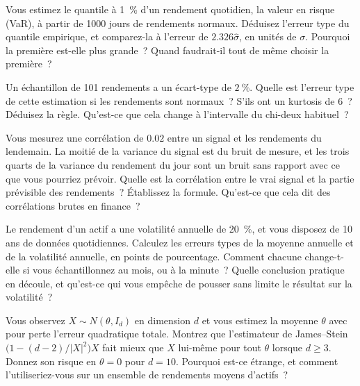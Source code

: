 \begin{question}\label{iq:iv1:statistics:34}
Vous estimez le quantile à 1~\% d'un rendement quotidien, la valeur en risque (VaR), à partir de 1000 jours de rendements normaux. Déduisez l'erreur type du quantile empirique, et comparez-la à l'erreur de $2.326\hat{\sigma}$, en unités de $\sigma$. Pourquoi la première est-elle plus grande~? Quand faudrait-il tout de même choisir la première~?
\end{question}

\begin{question}\label{iq:iv1:statistics:35}
Un échantillon de 101 rendements a un écart-type de $2~\%$. Quelle est l'erreur type de cette estimation si les rendements sont normaux~? S'ils ont un kurtosis de 6~? Déduisez la règle. Qu'est-ce que cela change à l'intervalle du chi-deux habituel~?
\end{question}

\begin{question}\label{iq:iv1:statistics:36}
Vous mesurez une corrélation de $0.02$ entre un signal et les rendements du lendemain. La moitié de la variance du signal est du bruit de mesure, et les trois quarts de la variance du rendement du jour sont un bruit sans rapport avec ce que vous pourriez prévoir. Quelle est la corrélation entre le vrai signal et la partie prévisible des rendements~? Établissez la formule. Qu'est-ce que cela dit des corrélations brutes en finance~?
\end{question}

\begin{question}\label{iq:iv1:statistics:37}
Le rendement d'un actif a une volatilité annuelle de 20~\%, et vous disposez de 10 ans de données quotidiennes. Calculez les erreurs types de la moyenne annuelle et de la volatilité annuelle, en points de pourcentage. Comment chacune change-t-elle si vous échantillonnez au mois, ou à la minute~? Quelle conclusion pratique en découle, et qu'est-ce qui vous empêche de pousser sans limite le résultat sur la volatilité~?
\end{question}

\begin{question}\label{iq:iv1:statistics:38}
Vous observez $X \sim N(\theta, I_d)$ en dimension $d$ et vous estimez la moyenne $\theta$ avec pour perte l'erreur quadratique totale. Montrez que l'estimateur de James--Stein $\bigl(1 - (d - 2)/|X|^2\bigr)X$ fait mieux que $X$ lui-même pour tout $\theta$ lorsque $d \ge 3$. Donnez son risque en $\theta = 0$ pour $d = 10$. Pourquoi est-ce étrange, et comment l'utiliseriez-vous sur un ensemble de rendements moyens d'actifs~?
\end{question}

